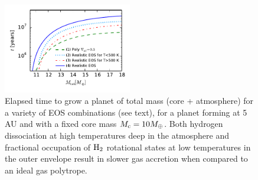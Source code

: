 

\begin{figure}[h]
\centering
\includegraphics[width=0.5\textwidth]{figures/tplot.pdf}
\caption{Elapsed time to grow a planet of total mass (core + atmosphere) for a variety of EOS combinations (see text), for a planet forming at 5 AU and with a fixed core mass $M_{\rm c}=10 M_{\oplus}$. Both hydrogen dissociation at high temperatures deep in the atmosphere and fractional occupation of $\rm H_2$ rotational states at low temperatures in the outer envelope result in slower gas accretion when compared to an ideal gas polytrope.}
\label{fig:tplotall}
\end{figure}



